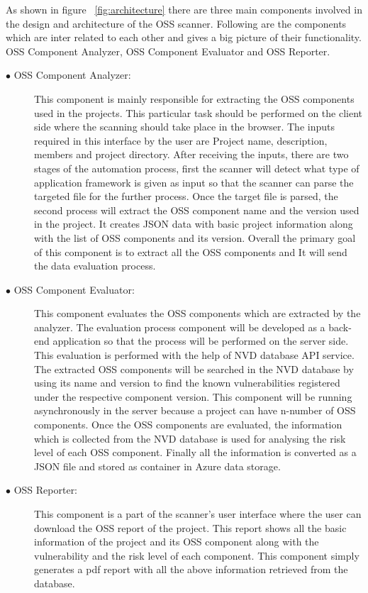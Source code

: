 As shown in figure ~\ref{fig:architecture} there are three main components involved in the design and architecture of the \acs{OSS} scanner. Following are the components which are inter related to each other and gives a big picture of their functionality. \acs{OSS} Component Analyzer, \acs{OSS} Component Evaluator and \acs{OSS} Reporter.
\begin{description}
	\item [$\bullet$ OSS Component Analyzer:] This component is mainly responsible for extracting the \acs{OSS} components used in the projects. This particular task should be performed on the client side where the scanning should take place in the browser. The inputs required in this interface by the user are Project name, description, members and project directory. After receiving the inputs, there are two stages of the automation process, first the scanner will detect what type of application framework is given as input so that the scanner can parse the targeted file for the further process. Once the target file is parsed, the second process will extract the \acs{OSS} component name and the version used in the project. It creates \acs{JSON} data with basic project information along with the list of \acs{OSS} components and its version. Overall the primary goal of this component is to extract all the \acs{OSS} components and It will send the data evaluation process.
	
	\item [$\bullet$ OSS Component Evaluator:] This component evaluates the \acs{OSS} components which are extracted by the analyzer. The evaluation process component will be developed as a back-end application so that the process will be performed on the server side. This evaluation is performed with the help of \acs{NVD} database \acs{API} service. The extracted \acs{OSS} components will be searched in the \acs{NVD} database by using its name and version to find the known vulnerabilities registered under the respective component version. This component will be running asynchronously in the server because a project can have n-number of \acs{OSS} components. Once the \acs{OSS} components are evaluated, the information which is collected from the \acs{NVD} database is used for analysing the risk level of each \acs{OSS} component. Finally all the information is converted as a \acs{JSON} file and stored as container in Azure data storage.
	
	\item [$\bullet$ OSS Reporter:] This component is a part of the scanner’s user interface where the user can download the \acs{OSS} report of the project. This report shows all the basic information of the project and its \acs{OSS} component along with the vulnerability and the risk level of each component. This component simply generates a pdf report with all the above information retrieved from the database.
	
\end{description}
